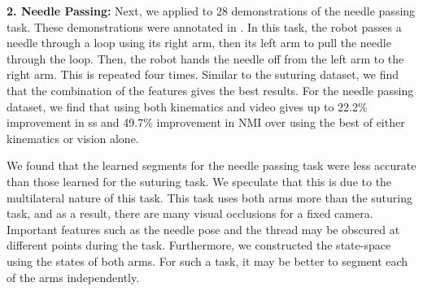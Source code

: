 \vspace{0.25em}
\noindent\textbf{2. Needle Passing: } Next, we applied \tsc to 28 demonstrations of the needle passing task.
These demonstrations were annotated in \cite{gao2014jigsaws}. 
In this task, the robot passes a needle through a loop using its right arm, then its left arm to pull the needle through the loop. Then, the robot hands the needle off from the left arm to the right arm. This is repeated four times. 
 Similar to the suturing dataset, we find that the combination of the features gives the best results.
 For the needle passing dataset, we find that using both kinematics and video gives up to 22.2\% improvement in \textsf{ss} and 49.7\% improvement in NMI over using the best of either kinematics or vision alone.

We found that the learned segments for the needle passing task were less accurate than those learned for the suturing task.
We speculate that this is due to the multilateral nature of this task.
This task uses both arms more than the suturing task, and as a result, there are many visual occlusions for a fixed camera. 
Important features such as the needle pose and the thread may be obscured at different points during the task.
Furthermore, we constructed the state-space using the states of both arms.
For such a task, it may be better to segment each of the arms independently.









